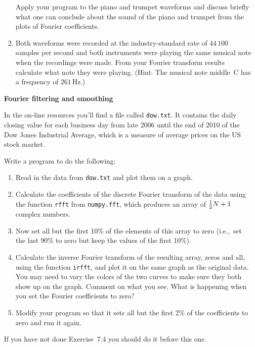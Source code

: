 \documentclass[12pt]{article}
\begin{document}
\begin{exercises}
\begin{enumerate}
  Apply your program to the piano and trumpet waveforms and discuss briefly
  what one can conclude about the sound of the piano and trumpet from the
  plots of Fourier coefficients.
\item Both waveforms were recorded at the industry-standard rate of
  $44\,100$ samples per second and both instruments were playing the same
  musical note when the recordings were made.  From your Fourier transform
  results calculate what note they were playing.  (Hint: The musical note
  middle~C has a frequency of $261\,$Hz.)
\end{enumerate}



\exercise \textbf{Fourier filtering and smoothing}

\exskip In the on-line resources you'll find a file called \verb|dow.txt|.
It contains the daily closing value for each business day from late 2006
until the end of 2010 of the Dow Jones Industrial Average, which is a
measure of average prices on the US stock market.

Write a program to do the following:
\begin{enumerate}\setlength{\itemsep}{0pt}
\item Read in the data from \verb|dow.txt| and plot them on a graph.
\item Calculate the coefficients of the discrete Fourier transform of the
  data using the function \verb|rfft| from \verb|numpy.fft|, which produces
  an array of $\tfrac12 N+1$ complex numbers.
\item Now set all but the first 10\% of the elements of this array to zero
  (i.e.,~set the last 90\% to zero but keep the values of the first 10\%).
\item Calculate the inverse Fourier transform of the resulting array, zeros
  and all, using the function \verb|irfft|, and plot it on the same graph
  as the original data.  You may need to vary the colors of the two curves
  to make sure they both show up on the graph.  Comment on what you see.
  What is happening when you set the Fourier coefficients to zero?
\item Modify your program so that it sets all but the first 2\% of the
  coefficients to zero and run it again.
\end{enumerate}



\exercise If you have not done Exercise~7.4 you should do it before this
one.


\end{exercises}
\end{document}
